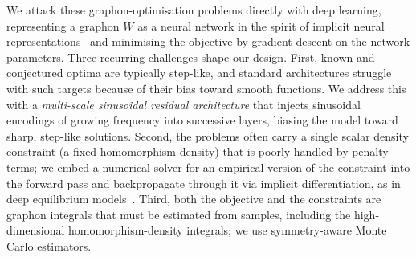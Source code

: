 \documentclass{article}
\theoremstyle{plain}
\theoremstyle{definition}
\theoremstyle{remark}
\begin{document}
We attack these graphon-optimisation problems directly with deep learning, representing a graphon $W$ as a neural network in the spirit of implicit neural representations~\citep{park2019deepsdf,mescheder2019occupancy,chen2019learning} and minimising the objective by gradient descent on the network parameters. Three recurring challenges shape our design. First, known and conjectured optima are typically step-like, and standard architectures struggle with such targets because of their bias toward smooth functions. We address this with a \emph{multi-scale sinusoidal residual architecture} that injects sinusoidal encodings of growing frequency into successive layers, biasing the model toward sharp, step-like solutions. Second, the problems often carry a single scalar density constraint (a fixed homomorphism density) that is poorly handled by penalty terms; we embed a numerical solver for an empirical version of the constraint into the forward pass and backpropagate through it via implicit differentiation, as in deep equilibrium models~\citep{bai2019deep}. Third, both the objective and the constraints are graphon integrals that must be estimated from samples, including the high-dimensional homomorphism-density integrals; we use symmetry-aware Monte Carlo estimators.
\end{document}
